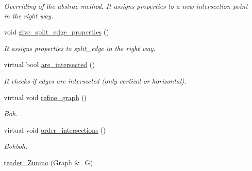 \begin{DoxyCompactItemize}
\begin{DoxyCompactList}\small\item\em Overriding of the abstrac method. It assigns properties to a new intersection point in the right way. \item\end{DoxyCompactList}\item 
\hypertarget{classfinal_ac69dad3a7c9800fbb30ab7bafd0f8500}{
void \hyperlink{classfinal_ac69dad3a7c9800fbb30ab7bafd0f8500}{give\_\-split\_\-edge\_\-properties} ()}
\label{classfinal_ac69dad3a7c9800fbb30ab7bafd0f8500}

\begin{DoxyCompactList}\small\item\em It assigns properties to split\_\-edge in the right way. \item\end{DoxyCompactList}\item 
\hypertarget{classfinal_abd3482cf7dd876deae3a923484466fc7}{
virtual bool \hyperlink{classfinal_abd3482cf7dd876deae3a923484466fc7}{are\_\-intersected} ()}
\label{classfinal_abd3482cf7dd876deae3a923484466fc7}

\begin{DoxyCompactList}\small\item\em It checks if edges are intersected (only vertical or horizontal). \item\end{DoxyCompactList}\item 
\hypertarget{classfinal_a5f6ad7c36438cd86375afd4187aa7968}{
virtual void \hyperlink{classfinal_a5f6ad7c36438cd86375afd4187aa7968}{refine\_\-graph} ()}
\label{classfinal_a5f6ad7c36438cd86375afd4187aa7968}

\begin{DoxyCompactList}\small\item\em Boh. \item\end{DoxyCompactList}\item 
\hypertarget{classfinal_a16ea2beb6f48f63167a5568561671142}{
virtual void \hyperlink{classfinal_a16ea2beb6f48f63167a5568561671142}{order\_\-intersections} ()}
\label{classfinal_a16ea2beb6f48f63167a5568561671142}

\begin{DoxyCompactList}\small\item\em Bohboh. \item\end{DoxyCompactList}\item 
\hypertarget{classfinal_a79af4d954bf722f3ec2b1b365e8c93e3}{
\hyperlink{classfinal_a79af4d954bf722f3ec2b1b365e8c93e3}{reader\_\-Zunino} (Graph \&\_\-G)}
\label{classfinal_a79af4d954bf722f3ec2b1b365e8c93e3}


\end{DoxyCompactItemize}

